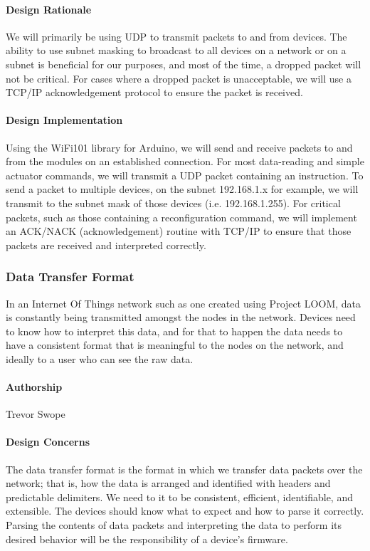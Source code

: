 \documentclass[onecolumn, draftclsnofoot,10pt, compsoc]{IEEEtran}
\begin{document}
\paragraph{Design Rationale}
    We will primarily be using UDP to transmit packets to and from devices. The ability to use subnet masking to broadcast to all devices on a network or on a subnet is beneficial for our purposes, and most of the time, a dropped packet will not be critical. For cases where a dropped packet is unacceptable, we will use a TCP/IP acknowledgement protocol to ensure the packet is received.

\paragraph{Design Implementation}
    Using the WiFi101 library for Arduino, we will send and receive packets to and from the modules on an established connection. For most data-reading and simple actuator commands, we will transmit a UDP packet containing an instruction. To send a packet to multiple devices, on the subnet 192.168.1.x for example, we will transmit to the subnet mask of those devices (i.e. 192.168.1.255). For critical packets, such as those containing a reconfiguration command, we will implement an ACK/NACK (acknowledgement) routine with TCP/IP to ensure that those packets are received and interpreted correctly.


\subsubsection{Data Transfer Format}
    In an Internet Of Things network such as one created using Project LOOM, data is constantly being transmitted amongst the nodes in the network. Devices need to know how to interpret this data, and for that to happen the data needs to have a consistent format that is meaningful to the nodes on the network, and ideally to a user who can see the raw data.

\paragraph{Authorship}
    Trevor Swope

\paragraph{Design Concerns}
    The data transfer format is the format in which we transfer data packets over the network; that is, how the data is  arranged and identified with headers and predictable delimiters. We need to it to be consistent, efficient, identifiable, and extensible. The devices should know what to expect and how to parse it correctly. Parsing the contents of data packets and interpreting the data to perform its desired behavior will be the responsibility of a device's firmware. 
\end{document}
